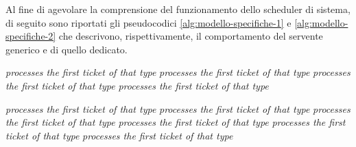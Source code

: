 Al fine di agevolare la comprensione del funzionamento dello scheduler di sistema, di seguito sono riportati gli pseudocodici \ref{alg:modello-specifiche-1} e \ref{alg:modello-specifiche-2} che descrivono, rispettivamente, il comportamento del servente generico e di quello dedicato.

\begin{algorithm}
\label{alg:modello-specifiche-1}
\begin{algorithmic}[1]
			\State \textit{processes the first ticket of that type}
		\Else
				\State \textit{processes the first ticket of that type}
			\EndIf
		\EndIf
	\Else
			\State \textit{processes the first ticket of that type}
		\Else
				\State \textit{processes the first ticket of that type}
			\EndIf
		\EndIf
	\EndIf
\EndWhile
\EndProcedure
\end{algorithmic}
\end{algorithm}

\begin{algorithm}
\label{alg:modello-specifiche-2}
\begin{algorithmic}[1]
			\State \textit{processes the first ticket of that type}
		\Else
				\State \textit{processes the first ticket of that type}
			\Else
					\State \textit{processes the first ticket of that type}
				\EndIf
			\EndIf
		\EndIf
	\Else
			\State \textit{processes the first ticket of that type}
		\Else
				\State \textit{processes the first ticket of that type}
			\Else
					\State \textit{processes the first ticket of that type}
				\EndIf
			\EndIf
		\EndIf
	\EndIf
\EndWhile
\EndProcedure
\end{algorithmic}
\end{algorithm}

